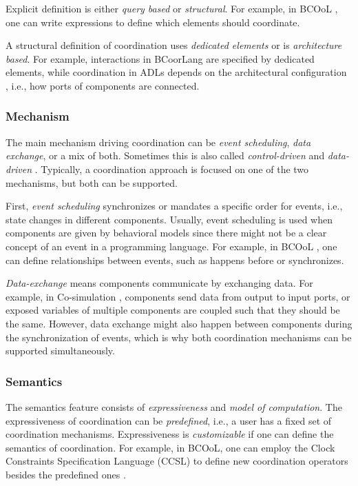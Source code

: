 \documentclass[runningheads]{llncs}
\begin{document}
Explicit definition is either \textit{query based} or \textit{structural}.
For example, in BCOoL \cite{varalarsenBCOolBehavioralCoordination2016,varalarsenBehavioralCoordinationOperator2015}, one can write expressions to define which elements should coordinate.

A structural definition of coordination uses \textit{dedicated elements} or is \textit{architecture based}.
For example, interactions in BCoorLang are specified by dedicated elements, while coordination in ADLs depends on the architectural configuration \cite{medvidovicClassificationComparisonFramework2000}, i.e., how ports of components are connected.

\subsubsection{Mechanism} The main mechanism driving coordination can be \textit{event scheduling}, \textit{data exchange}, or a mix of both.
Sometimes this is also called \textit{control-driven} and \textit{data-driven} \cite{papadopoulosCoordinationModelsLanguages1998,varalarsenBCOolBehavioralCoordination2016}.
Typically, a coordination approach is focused on one of the two mechanisms, but both can be supported.

First, \textit{event scheduling} synchronizes or mandates a specific order for events, i.e., state changes in different components.
Usually, event scheduling is used when components are given by behavioral models since there might not be a clear concept of an event in a programming language.
For example, in BCOoL \cite{varalarsenBehavioralCoordinationOperator2015}, one can define relationships between events, such as happens before or synchronizes.

\textit{Data-exchange} means components communicate by exchanging data.
For example, in Co-simulation \cite{gomesCoSimulationSurvey2019}, components send data from output to input ports, or exposed variables of multiple components are coupled such that they should be the same. %
However, data exchange might also happen between components during the synchronization of events, which is why both coordination mechanisms can be supported simultaneously.

\subsubsection{Semantics} The semantics feature consists of \textit{expressiveness} and \textit{model of computation}.
The expressiveness of coordination can be \textit{predefined}, i.e., a user has a fixed set of coordination mechanisms.
Expressiveness is \textit{customizable} if one can define the semantics of coordination.
For example, in BCOoL, one can employ the Clock Constraints Specification Language (CCSL) \cite{andreSyntaxSemanticsClock2009} to define new coordination operators besides the predefined ones \cite{varalarsenBCOolBehavioralCoordination2016,varalarsenBehavioralCoordinationOperator2015}.
\end{document}
